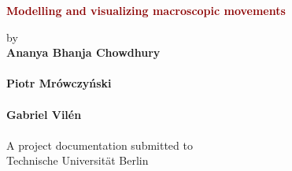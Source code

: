 \begin{titlepage}
	\strut
	\hfill
	\begin{center}
	\vspace{1cm}
		\Huge
		\begin{spacing}{.9}
			\textcolor{DarkRed}{\textbf{Modelling and visualizing macroscopic movements}}\\
		\end{spacing}
		\vspace{0.8cm}
		\large
		by\\
		\vspace{0.8cm}
		\textbf{Ananya Bhanja Chowdhury}\\
		\\
		\vspace{0.4cm}
		\textbf{Piotr Mrówczyński}\\
		\\
		\vspace{0.4cm}
		\textbf{Gabriel Vilén}\\
		\\
		\vspace{2cm}
	 	A project documentation submitted to\\
		\vspace{0.5cm}
		Technische Universität Berlin\\

\end{center}
\end{titlepage}
